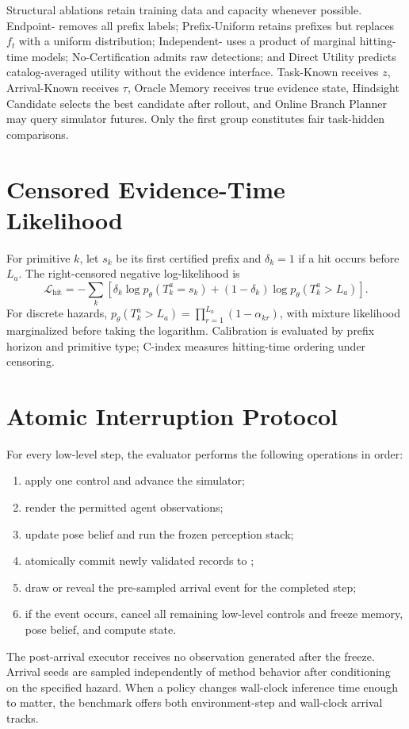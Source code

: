 Structural ablations retain training data and capacity whenever possible.
Endpoint-\jet{} removes all prefix labels; Prefix-Uniform retains prefixes but replaces $f_t$ with a uniform distribution; Independent-\jet{} uses a product of marginal hitting-time models; No-Certification admits raw detections; and Direct Utility predicts catalog-averaged utility without the evidence interface.
Task-Known receives $z$, Arrival-Known receives $\tau$, Oracle Memory receives true evidence state, Hindsight Candidate selects the best candidate after rollout, and Online Branch Planner may query simulator futures.
Only the first group constitutes fair task-hidden comparisons.

\section{Censored Evidence-Time Likelihood}
\label{app:likelihood}

For primitive $k$, let $s_k$ be its first certified prefix and $\delta_k=1$ if a hit occurs before $L_a$.
The right-censored negative log-likelihood is
\begin{equation}
\mathcal{L}_{\mathrm{hit}}=
-\sum_k\left[
\delta_k\log p_\theta(T_k^a=s_k)
+(1-\delta_k)\log p_\theta(T_k^a>L_a)
\right].
\end{equation}
For discrete hazards,
$p_\theta(T_k^a>L_a)=\prod_{r=1}^{L_a}(1-\alpha_{kr})$,
with mixture likelihood marginalized before taking the logarithm.
Calibration is evaluated by prefix horizon and primitive type; C-index measures hitting-time ordering under censoring.

\section{Atomic Interruption Protocol}
\label{app:atomic}

For every low-level step, the evaluator performs the following operations in order:
\begin{enumerate}[leftmargin=*]
  \item apply one control and advance the simulator;
  \item render the permitted agent observations;
  \item update pose belief and run the frozen perception stack;
  \item atomically commit newly validated records to \rfm{};
  \item draw or reveal the pre-sampled arrival event for the completed step;
  \item if the event occurs, cancel all remaining low-level controls and freeze memory, pose belief, and compute state.
\end{enumerate}
The post-arrival executor receives no observation generated after the freeze.
Arrival seeds are sampled independently of method behavior after conditioning on the specified hazard.
When a policy changes wall-clock inference time enough to matter, the benchmark offers both environment-step and wall-clock arrival tracks.

